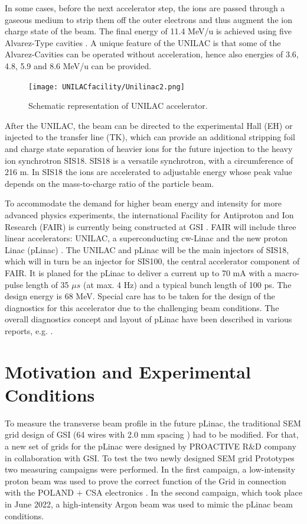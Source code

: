 In some cases, before the next accelerator step, the ions are passed through a gaseous medium to strip them off the outer electrons and thus augment the ion charge state of the beam. The final energy of 11.4 MeV/u is achieved using five Alvarez-Type cavities \parencite[]{ref:AlvarezCavity}. A unique feature of the UNILAC is that some of the Alvarez-Cavities can be operated without acceleration, hence also energies of 3.6, 4.8, 5.9 and 8.6 MeV/u can be provided. 

\begin{figure}[h]
    \centering
    \texttt{[image: UNILACfacility/Unilinac2.png]}
    \caption{Schematic representation of UNILAC accelerator.}
    \label{fig:UNILAC}
\end{figure}


After the UNILAC, the beam can be directed to the experimental Hall (EH) or injected to the transfer line (TK), which can provide an additional stripping foil and charge state separation of heavier ions for the future injection to the heavy ion synchrotron SIS18. SIS18 is a versatile synchrotron, with a circumference of 216 m. In SIS18 the ions are accelerated to adjustable energy whose peak value depends on the mass-to-charge ratio of the particle beam. 

To accommodate the demand for higher beam energy and intensity for more advanced physics experiments, the international Facility for Antiproton and Ion Research (FAIR) is currently being constructed at GSI \parencite*[]{ref:FAIR}. FAIR will include three linear accelerators: UNILAC, a superconducting cw-Linac \parencite*[]{ref:cwLinac} and the new proton Linac (pLinac) \parencite[][]{ref:pLinac}. The UNILAC and pLinac will be the main injectors of SIS18, which will in turn be an injector for SIS100, the central accelerator component of FAIR. It is planed for the pLinac to deliver a current up to 70 mA with a macro-pulse length of 35 $\mu s$ (at max. 4 Hz) and a typical bunch length of 100 ps. The design energy is 68 MeV. Special care has to be taken for the design of the diagnostics for this accelerator due to the challenging beam conditions. The overall diagnostics concept and layout of pLinac have been described in various reports, e.g. \parencite[][]{ref:InstruLinac}. 

\section{Motivation and Experimental Conditions}

To measure the transverse beam profile in the future pLinac, the traditional SEM grid design of GSI (64 wires with 2.0 mm spacing ) had to be modified. For that, a new set of grids for the pLinac were designed by PROACTIVE R$\&$D company in collaboration with GSI. To test the two newly designed SEM grid Prototypes two measuring campaigns were performed. In the first campaign, a low-intensity proton beam was used to prove the correct function of the Grid in connection with the POLAND $+$ CSA electronics \parencite[]{ref:ElectronicsSEMgsi}. In the second campaign, which took place in June 2022, a high-intensity Argon beam was used to mimic the pLinac beam conditions. 

